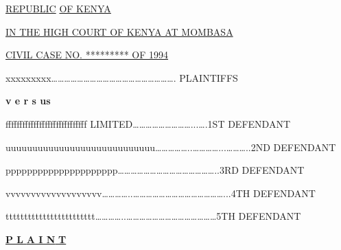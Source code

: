 \documentclass[12pt,a4paper]{article}
\begin{document}
\begin{center}\uline{REPUBLIC} \uline{OF KENYA}\end{center}


\begin{center}\uline{IN THE HIGH COURT OF KENYA AT MOMBASA}\end{center}


\begin{center}\uline{CIVIL CASE NO. ********}\uline{*  OF}\uline{ 1994}\end{center}


\begin{flushleft}xxxxxxxxx………………………………………………….   PLAINTIFFS\end{flushleft}


\begin{flushleft}\textbf{v e r s us}\end{flushleft}


\begin{flushleft}fffffffffffffffffffffffffffff LIMITED………………………...….1ST DEFENDANT\end{flushleft}


\begin{flushleft}uuuuuuuuuuuuuuuuuuuuuuuuuuuu……………..…………...………..2ND DEFENDANT\end{flushleft}


\begin{flushleft}ppppppppppppppppppppp………………………………………..3RD DEFENDANT\end{flushleft}


\begin{flushleft}vvvvvvvvvvvvvvvvvvv…………..……………………………………...4TH DEFENDANT\end{flushleft}


\begin{flushleft}tttttttttttttttttttttttt…………..……………………………………5TH DEFENDANT\end{flushleft}


\begin{flushleft}\uline{\textbf{P  L}}\uline{\textbf{  A  I  N}}\uline{\textit{\textbf{  }}}\uline{\textbf{T}}\end{flushleft}
\end{document}
